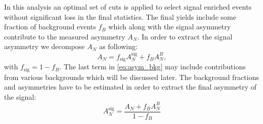 \documentclass[12pt]{article}
\begin{document}
In this analysis an optimal set of cuts is applied to select signal enriched
events without significant loss in the final statistics. The final yields
include some fraction of background events $f_B$ which along with the signal
asymmetry contribute to the measured asymmetry $A_N$. In order to extract the
signal asymmetry we decompose $A_N$ as following:
%
\begin{equation}
A_N = f_\text{sig} A^\text{sig}_N + f_B A^B_N,
\label{eq:asym_bkg}
\end{equation}
%
with $f_\text{sig} = 1 - f_B$. The last term in \eqref{eq:asym_bkg} may include
contributions from various backgrounds which will be discussed later. The
background fractions and asymmetries have to be estimated in order to extract
the final asymmetry of the signal:
%
\begin{equation}
A^\text{sig}_N = \frac{A_N + f_B A^B_N}{1 - f_B}
\label{eq_bkg_corr}
\end{equation}




%
%
%
%
\end{document}
